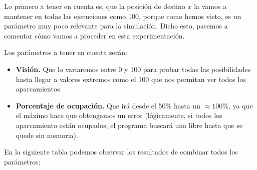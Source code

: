 \documentclass[11pt,a4paper]{report}
\begin{document}
Lo primero a tener en cuenta es, que la posición de destino $x$ la vamos a mantener en todas las ejecuciones como 100, porque
como hemos visto, es un parámetro muy poco relevante para la simulación. Dicho esto, pasemos a comentar cómo vamos a proceder
en esta experimentación.

Los parámetros a tener en cuenta serán:
\begin{itemize}[label=\textbullet]
	\item \textbf{Visión.} Que lo variaremos entre 0 y 100 para probar todas las posibilidades hasta llegar a valores extremos
	como el 100 que nos permitan ver todos los aparcamientos
	\item \textbf{Porcentaje de ocupación.} Que irá desde el 50\% hasta un $\approx100\%$, ya que el máximo hace que obtengamos
	un error (lógicamente, si todos los aparcamiento están ocupados, el programa buscará uno libre hasta que se quede sin memoria).
\end{itemize}

\newpage

En la siguiente tabla podemos observar los resultados de combinar todos los parámetros:
\end{document}
